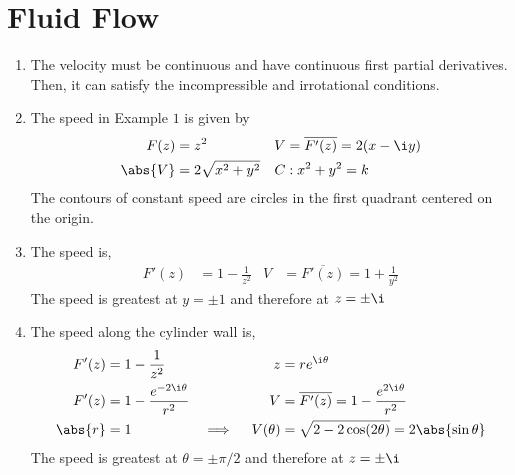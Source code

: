 \section{Fluid Flow}

\begin{enumerate}
    \item The velocity must be continuous and have continuous first partial derivatives.
          Then, it can satisfy the incompressible and irrotational conditions.

    \item The speed in Example $ 1 $ is given by
          \begin{align}
              F(z)    & = z^2               & V & = \overline{F'(z)} = 2(x - \i y) \\
              \abs{V} & = 2\sqrt{x^2 + y^2} & C & : x^2 + y^2 = k
          \end{align}
          The contours of constant speed are circles in the first quadrant centered on
          the origin.

    \item The speed is,
          \begin{align}
              F'(z) & = 1 - \frac{1}{z^2}                    &
              V     & = \overline{F'(z)} = 1 + \frac{1}{y^2}
          \end{align}
          The speed is greatest at $ y = \pm 1 $ and therefore at $ z = \pm \i $

    \item The speed along the cylinder wall is,
          \begin{align}
              F'(z)   & = 1 - \frac{1}{z^2}                                 &
              z       & = r e^{\i \theta}                                     \\
              F'(z)   & = 1 - \frac{e^{-2\i \theta}}{r^2}                   &
              V       & =  \overline{F'(z)} = 1 - \frac{e^{2\i\theta}}{r^2}   \\
              \abs{r} & = 1                                                 &
              \implies \quad V(\theta)
                      & = \sqrt{2 - 2\cos(2\theta)} = 2\abs{\sin\theta}
          \end{align}
          The speed is greatest at $ \theta = \pm\pi/2 $ and therefore at $ z = \pm\i $


\end{enumerate}
